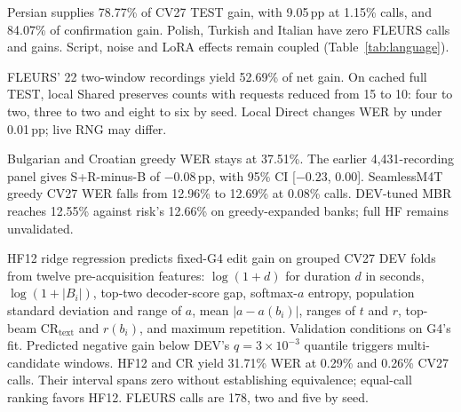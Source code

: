 Persian supplies 78.77\% of CV27 TEST gain, with 9.05\,pp at 1.15\% calls, and 84.07\% of confirmation gain. Polish, Turkish and Italian have zero FLEURS calls and gains. Script, noise and LoRA effects remain coupled (Table~\ref{tab:language}).

FLEURS' 22 two-window recordings yield 52.69\% of net gain. On cached full TEST, local Shared preserves counts with requests reduced from 15 to 10: four to two, three to two and eight to six by seed. Local Direct changes WER by under 0.01\,pp; live RNG may differ.

Bulgarian and Croatian greedy WER stays at 37.51\%. The earlier 4,431-recording panel gives S+R-minus-B of $-0.08$\,pp, with 95\% CI [$-0.23$, $0.00$]. SeamlessM4T~\cite{seamless2023,seamlessv1nature} greedy CV27 WER falls from 12.96\% to 12.69\% at 0.08\% calls. DEV-tuned MBR reaches 12.55\% against risk's 12.66\% on greedy-expanded banks; full HF remains unvalidated.

HF12 ridge regression predicts fixed-G4 edit gain on grouped CV27 DEV folds from twelve pre-acquisition features: $\log(1+d)$ for duration $d$ in seconds, $\log(1+|B_i|)$, top-two decoder-score gap, softmax-$a$ entropy, population standard deviation and range of $a$, mean $|a-a(b_i)|$, ranges of $t$ and $r$, top-beam $\mathrm{CR}_{\mathrm{text}}$ and $r(b_i)$, and maximum repetition. Validation conditions on G4's fit. Predicted negative gain below DEV's $q=3\times10^{-3}$ quantile triggers multi-candidate windows. HF12 and CR yield 31.71\% WER at 0.29\% and 0.26\% CV27 calls. Their interval spans zero without establishing equivalence; equal-call ranking favors HF12. FLEURS calls are 178, two and five by seed.
